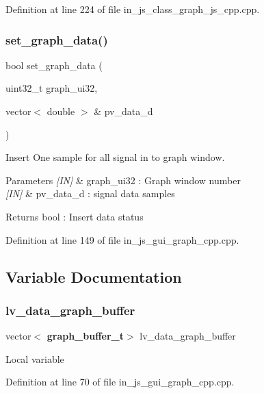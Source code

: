 Definition at line 224 of file in\+\_\+js\+\_\+class\+\_\+graph\+\_\+js\+\_\+cpp.\+cpp.

\mbox{\label{group___graph_ga4e9353b837f57c5c436140db51393ad0}} 
\subsubsection{set\_graph\_data()}
{\footnotesize\ttfamily bool set\+\_\+graph\+\_\+data (\begin{DoxyParamCaption}\item[{uint32\+\_\+t}]{graph\+\_\+ui32,  }\item[{vector$<$ double $>$ \&}]{pv\+\_\+data\+\_\+d }\end{DoxyParamCaption})}



Insert One sample for all signal in to graph window. 


\begin{DoxyParams}{Parameters}
{\em \mbox{[}\+I\+N\mbox{]}} & graph\+\_\+ui32 \+: Graph window number \\
\hline
{\em \mbox{[}\+I\+N\mbox{]}} & pv\+\_\+data\+\_\+d \+: signal data samples \\
\hline
\end{DoxyParams}
\begin{DoxyReturn}{Returns}
bool \+: Insert data status 
\end{DoxyReturn}


Definition at line 149 of file in\+\_\+js\+\_\+gui\+\_\+graph\+\_\+cpp.\+cpp.



\subsection{Variable Documentation}
\mbox{\label{group___graph_ga70d4a6633d9b5972dcb026390127f139}} 
\subsubsection{lv\_data\_graph\_buffer}
{\footnotesize\ttfamily vector$<$\textbf{ graph\+\_\+buffer\+\_\+t}$>$ lv\+\_\+data\+\_\+graph\+\_\+buffer}

Local variable 

Definition at line 70 of file in\+\_\+js\+\_\+gui\+\_\+graph\+\_\+cpp.\+cpp.

